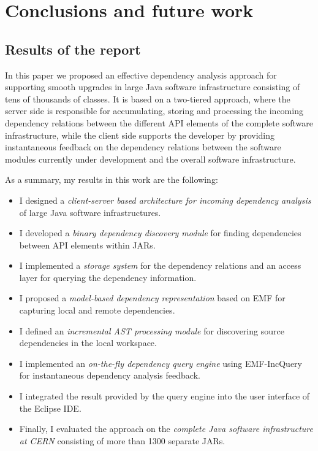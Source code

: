 \chapter{Conclusions and future work}


\section{Results of the report}

In this paper we proposed an effective dependency analysis approach for
supporting smooth upgrades in large Java software infrastructure consisting of
tens of thousands of classes. It is based on a two-tiered approach, where the
server side is responsible for accumulating, storing and processing the incoming
dependency relations between the different API elements of the complete software
infrastructure, while the client side supports the developer by providing
instantaneous feedback on the dependency relations between the software modules
currently under development and the overall software infrastructure.

As a summary, my results in this work are the following:
\begin{itemize}
\item I designed a \emph{client-server based architecture for incoming
dependency analysis} of large Java software infrastructures.
\item I developed a \emph{binary dependency discovery module} for finding
dependencies between API elements within JARs.
\item I implemented a \emph{storage system} for the dependency relations and an
access layer for querying the dependency information.
\item I proposed a \emph{model-based dependency representation} based on EMF for
capturing local and remote dependencies.
\item I defined an \emph{incremental AST processing module} for discovering
source dependencies in the local workspace.
\item I implemented an \emph{on-the-fly dependency query engine} using
EMF-IncQuery for instantaneous dependency analysis feedback.
\item I integrated the result provided by the query engine into the user
interface of the Eclipse IDE.
\item Finally, I evaluated the approach on the \emph{complete Java software
infrastructure at CERN} consisting of more than 1300 separate JARs.
\end{itemize}

